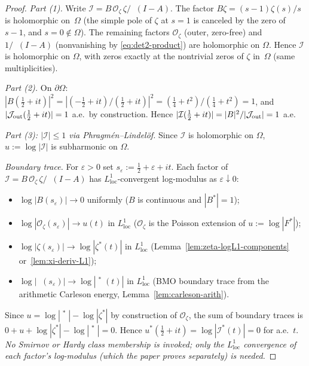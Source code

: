 \documentclass[11pt]{amsart}
\theoremstyle{definition}
\theoremstyle{remark}
\DeclareMathOperator{\dettwo}{det_2}
\begin{document}
\begin{proof}
\emph{Part (1).}
Write
\(
\mathcal I=B\,\mathcal O_\zeta\,\zeta/\dettwo(I\!-\!A).
\)
The factor \(B\zeta=(s\!-\!1)\zeta(s)/s\) is holomorphic on~\(\Omega\)
(the simple pole of \(\zeta\) at \(s\!=\!1\) is canceled by the zero of \(s\!-\!1\),
and \(s\!=\!0\notin\Omega\)).
The remaining factors \(\mathcal O_\zeta\) (outer, zero-free)
and \(1/\dettwo(I\!-\!A)\) (nonvanishing by \eqref{eq:det2-product})
are holomorphic on \(\Omega\).
Hence \(\mathcal I\) is holomorphic on \(\Omega\), with zeros exactly at the
nontrivial zeros of \(\zeta\) in~\(\Omega\) (same multiplicities).

\emph{Part (2).}
On \(\partial\Omega\): \(|B(\tfrac12+it)|^2
=|({-}\tfrac12+it)/(\tfrac12+it)|^2
=(\tfrac14+t^2)/(\tfrac14+t^2)=1\),
and \(|\mathcal J_{\rm out}(\tfrac12+it)|=1\) a.e.\
by construction.
Hence \(|\mathcal I(\tfrac12+it)|=|B|^2/|\mathcal J_{\rm out}|=1\) a.e.

\emph{Part (3): \(|\mathcal I|\le 1\) via Phragm\'en--Lindel\"of.}
Since \(\mathcal I\) is holomorphic on \(\Omega\),
\(u:=\log|\mathcal I|\) is subharmonic on \(\Omega\).

\emph{Boundary trace.}
For \(\varepsilon>0\) set \(s_\varepsilon:=\tfrac12+\varepsilon+it\).
Each factor of
\(\mathcal I=B\,\mathcal O_\zeta\,\zeta/\dettwo(I\!-\!A)\)
has \(L^1_{\mathrm{loc}}\)-convergent log-modulus as \(\varepsilon\downarrow 0\):
\begin{itemize}
\item \(\log|B(s_\varepsilon)|\to 0\) uniformly (\(B\) is continuous and \(|B^*|=1\));
\item \(\log|\mathcal O_\zeta(s_\varepsilon)|\to u(t)\) in \(L^1_{\mathrm{loc}}\)
  (\(\mathcal O_\zeta\) is the Poisson extension of \(u:=\log|F^*|\));
\item \(\log|\zeta(s_\varepsilon)|\to\log|\zeta^*(t)|\) in \(L^1_{\mathrm{loc}}\)
  (Lemma~\ref{lem:zeta-logL1-components} or~\ref{lem:xi-deriv-L1});
\item \(\log|\dettwo(s_\varepsilon)|\to\log|\dettwo^*(t)|\) in \(L^1_{\mathrm{loc}}\)
  (BMO boundary trace from the arithmetic Carleson energy, Lemma~\ref{lem:carleson-arith}).
\end{itemize}
Since \(u=\log|\dettwo^*|-\log|\zeta^*|\) by construction of \(\mathcal O_\zeta\),
the sum of boundary traces is
\(0+u+\log|\zeta^*|-\log|\dettwo^*|=0\).
Hence \(u^*(\tfrac12+it)=\log|\mathcal I^*(t)|=0\) for a.e.\ \(t\).
\emph{No Smirnov or Hardy class membership is invoked; only
the \(L^1_{\mathrm{loc}}\) convergence of each factor's log-modulus
(which the paper proves separately) is needed.}


\end{proof}
\end{document}
